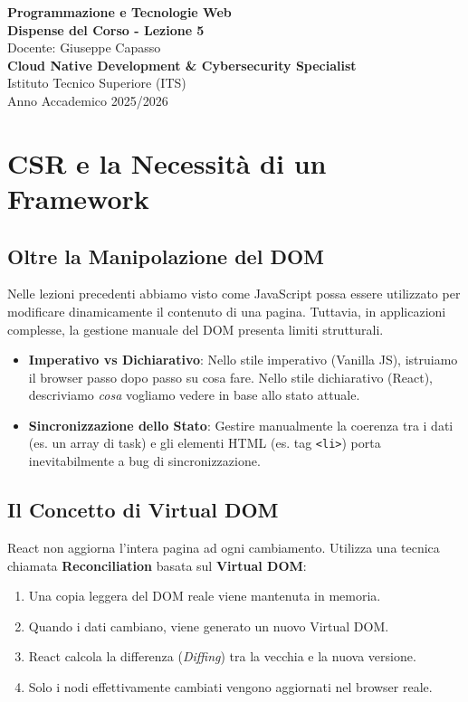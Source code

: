 \documentclass[11pt,a4paper]{report}
\begin{document}
\begin{titlepage}
    \centering
    \vspace*{4cm}
    {\Huge \textbf{\color{primary} Programmazione e Tecnologie Web}} \\[1.5cm]
    {\Large \textbf{Dispense del Corso - Lezione 5}} \\[0.5cm]
    {\large Docente: Giuseppe Capasso} \\[1.5cm]
    {\normalsize \textbf{Cloud Native Development \& Cybersecurity Specialist}} \\
    {\normalsize Istituto Tecnico Superiore (ITS)} \\
    \vfill
    {\normalsize Anno Accademico 2025/2026}
\end{titlepage}

\newpage
\tableofcontents
\newpage

\chapter{CSR e la Necessità di un Framework}

\section{Oltre la Manipolazione del DOM}
Nelle lezioni precedenti abbiamo visto come JavaScript possa essere utilizzato per modificare dinamicamente il contenuto di una pagina. Tuttavia, in applicazioni complesse, la gestione manuale del DOM presenta limiti strutturali.

\begin{itemize}
    \item \textbf{Imperativo vs Dichiarativo}: Nello stile imperativo (Vanilla JS), istruiamo il browser passo dopo passo su cosa fare. Nello stile dichiarativo (React), descriviamo \textit{cosa} vogliamo vedere in base allo stato attuale.
    \item \textbf{Sincronizzazione dello Stato}: Gestire manualmente la coerenza tra i dati (es. un array di task) e gli elementi HTML (es. tag \texttt{<li>}) porta inevitabilmente a bug di sincronizzazione.
\end{itemize}

\section{Il Concetto di Virtual DOM}
React non aggiorna l'intera pagina ad ogni cambiamento. Utilizza una tecnica chiamata \textbf{Reconciliation} basata sul \textbf{Virtual DOM}:
\begin{enumerate}
    \item Una copia leggera del DOM reale viene mantenuta in memoria.
    \item Quando i dati cambiano, viene generato un nuovo Virtual DOM.
    \item React calcola la differenza (\textit{Diffing}) tra la vecchia e la nuova versione.
    \item Solo i nodi effettivamente cambiati vengono aggiornati nel browser reale.
\end{enumerate}
\end{document}
